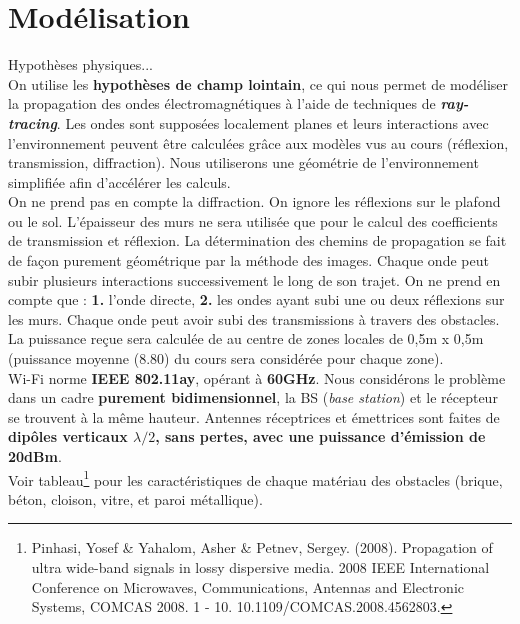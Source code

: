 \chapter{Modélisation}
\label{chaper-1}

Hypothèses physiques...\\

On utilise les \textbf{hypothèses de champ lointain}, ce qui nous permet de modéliser la propagation des ondes électromagnétiques à l'aide de techniques de \textbf{\textit{ray-tracing}}. Les ondes sont supposées localement planes et leurs interactions avec l'environnement peuvent être calculées grâce aux modèles vus au cours (réflexion, transmission, diffraction). Nous utiliserons une géométrie de l'environnement simplifiée afin d'accélérer les calculs.\\
On ne prend pas en compte la diffraction. On ignore les réflexions sur le plafond ou le sol. L'épaisseur des murs ne sera utilisée que pour le calcul des coefficients de transmission et réflexion. La détermination des chemins de propagation se fait de façon purement géométrique par la méthode des images. Chaque onde peut subir plusieurs interactions successivement le long de son trajet. On ne prend en compte que : \textbf{1.} l'onde directe, \textbf{2.} les ondes ayant subi une ou deux réflexions sur les murs. Chaque onde peut avoir subi des transmissions à travers des obstacles.\\
La puissance reçue sera calculée de au centre de zones locales de 0,5m x 0,5m (puissance moyenne (8.80) du cours sera considérée pour chaque zone).\\

Wi-Fi norme \textbf{IEEE 802.11ay}, opérant à \textbf{60GHz}. Nous considérons le problème dans un cadre \textbf{purement bidimensionnel}, la BS (\textit{base station}) et le récepteur se trouvent à la même hauteur. Antennes réceptrices et émettrices sont faites de \textbf{dipôles verticaux $\lambda/2$, sans pertes, avec une puissance d'émission de 20dBm}.\\
Voir tableau\footnote{Pinhasi, Yosef \& Yahalom, Asher \& Petnev, Sergey. (2008). Propagation of ultra wide-band signals in lossy dispersive media. 2008 IEEE International Conference on Microwaves, Communications, Antennas and Electronic Systems, COMCAS 2008. 1 - 10. 10.1109/COMCAS.2008.4562803.} pour les caractéristiques de chaque matériau des obstacles (brique, béton, cloison, vitre, et paroi métallique).\\

